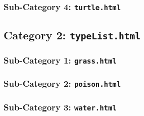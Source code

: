 \subsubsection{Sub-Category 4: \texttt{turtle.html}}



\newpage
\subsection{Category 2: \texttt{typeList.html}}


\newpage
\subsubsection{Sub-Category 1: \texttt{grass.html}}

\newpage
\subsubsection{Sub-Category 2: \texttt{poison.html}}

\newpage
\subsubsection{Sub-Category 3: \texttt{water.html}}
